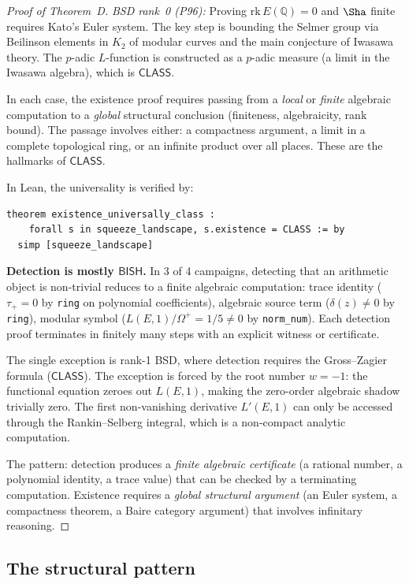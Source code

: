 \documentclass[11pt]{article}
\theoremstyle{plain}
\theoremstyle{definition}
\theoremstyle{remark}
\newcommand{\Q}{\mathbb{Q}}
\newcommand{\rk}{\mathrm{rk}}
\newcommand{\BISH}{\ensuremath{\mathsf{BISH}}}
\newcommand{\CLASS}{\ensuremath{\mathsf{CLASS}}}
\begin{document}
\begin{proof}[Proof of Theorem~D]
\emph{BSD rank~0 (P96):} Proving $\rk\, E(\Q) = 0$ and $\Sha$ finite requires Kato's Euler system. The key step is bounding the Selmer group via Beilinson elements in $K_2$ of modular curves and the main conjecture of Iwasawa theory. The $p$-adic $L$-function is constructed as a $p$-adic measure (a limit in the Iwasawa algebra), which is $\CLASS$.

In each case, the existence proof requires passing from a \emph{local} or \emph{finite} algebraic computation to a \emph{global} structural conclusion (finiteness, algebraicity, rank bound). The passage involves either: a compactness argument, a limit in a complete topological ring, or an infinite product over all places. These are the hallmarks of $\CLASS$.

In Lean, the universality is verified by:
\begin{lstlisting}[style=leanstyle]
theorem existence_universally_class :
    forall s in squeeze_landscape, s.existence = CLASS := by
  simp [squeeze_landscape]
\end{lstlisting}

\textbf{Detection is mostly $\BISH$.} In 3 of 4 campaigns, detecting that an arithmetic object is non-trivial reduces to a finite algebraic computation: trace identity ($\tau_+ = 0$ by \texttt{ring} on polynomial coefficients), algebraic source term ($\delta(z) \neq 0$ by \texttt{ring}), modular symbol ($L(E,1)/\Omega^+ = 1/5 \neq 0$ by \texttt{norm\_num}). Each detection proof terminates in finitely many steps with an explicit witness or certificate.

The single exception is rank-1 BSD, where detection requires the Gross--Zagier formula ($\CLASS$). The exception is forced by the root number $w = -1$: the functional equation zeroes out $L(E,1)$, making the zero-order algebraic shadow trivially zero. The first non-vanishing derivative $L'(E,1)$ can only be accessed through the Rankin--Selberg integral, which is a non-compact analytic computation.

The pattern: detection produces a \emph{finite algebraic certificate} (a rational number, a polynomial identity, a trace value) that can be checked by a terminating computation. Existence requires a \emph{global structural argument} (an Euler system, a compactness theorem, a Baire category argument) that involves infinitary reasoning.
\end{proof}

\subsection{The structural pattern}
\end{document}
